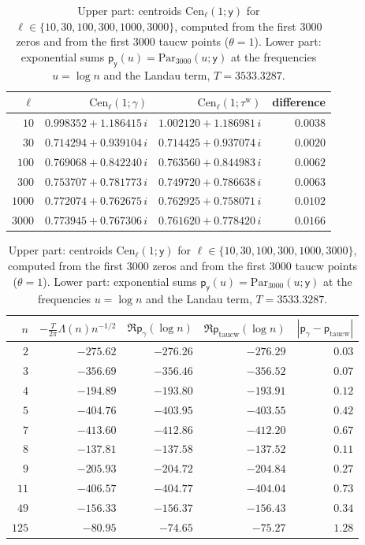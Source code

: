 \documentclass[11pt,a4paper]{article}
\numberwithin{equation}{section}
\theoremstyle{definition}
\theoremstyle{remark}
\begin{document}
\begin{table}[ht]
\centering\small
\begin{tabular}{@{}rrrr@{}}
\toprule
$\ell$ & $\mathrm{Cen}_\ell(1;\gamma)$ & $\mathrm{Cen}_\ell(1;\tau^{\mathrm w})$ & difference\\
\midrule
$10$ & $0.998352+1.186415\,i$ & $1.002120+1.186981\,i$ & $0.0038$\\
$30$ & $0.714294+0.939104\,i$ & $0.714425+0.937074\,i$ & $0.0020$\\
$100$ & $0.769068+0.842240\,i$ & $0.763560+0.844983\,i$ & $0.0062$\\
$300$ & $0.753707+0.781773\,i$ & $0.749720+0.786638\,i$ & $0.0063$\\
$1000$ & $0.772074+0.762675\,i$ & $0.762925+0.758071\,i$ & $0.0102$\\
$3000$ & $0.773945+0.767306\,i$ & $0.761620+0.778420\,i$ & $0.0166$\\
\bottomrule
\end{tabular}

\medskip
\begin{tabular}{@{}rrrrr@{}}
\toprule
$n$ & $-\frac T{2\pi}\Lambda(n)n^{-1/2}$ & $\Re\mathsf p_\gamma(\log n)$ & $\Re\mathsf p_{\mathrm{taucw}}(\log n)$ & $|\mathsf p_\gamma-\mathsf p_{\mathrm{taucw}}|$\\
\midrule
$2$ & $-275.62$ & $-276.26$ & $-276.29$ & $0.03$\\
$3$ & $-356.69$ & $-356.46$ & $-356.52$ & $0.07$\\
$4$ & $-194.89$ & $-193.80$ & $-193.91$ & $0.12$\\
$5$ & $-404.76$ & $-403.95$ & $-403.55$ & $0.42$\\
$7$ & $-413.60$ & $-412.86$ & $-412.20$ & $0.67$\\
$8$ & $-137.81$ & $-137.58$ & $-137.52$ & $0.11$\\
$9$ & $-205.93$ & $-204.72$ & $-204.84$ & $0.27$\\
$11$ & $-406.57$ & $-404.77$ & $-404.04$ & $0.73$\\
$49$ & $-156.33$ & $-156.37$ & $-156.43$ & $0.34$\\
$125$ & $-80.95$ & $-74.65$ & $-75.27$ & $1.28$\\
\bottomrule
\end{tabular}
\caption{Upper part: centroids $\mathrm{Cen}_\ell(1;\mathsf y)$ for $\ell\in\{10,30,100,300,1000,3000\}$, computed from the first $3000$ zeros and from the first $3000$ taucw points ($\theta=1$). Lower part: exponential sums $\mathsf p_{\mathsf y}(u)=\mathrm{Par}_{3000}(u;\mathsf y)$ at the frequencies $u=\log n$ and the Landau term, $T=3533.3287$.}\label{tab:taucw-cen}
\end{table}
\end{document}
